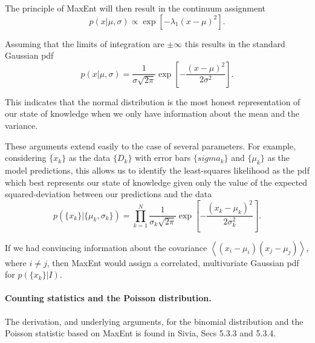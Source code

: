 \documentclass[%
oneside,                 %
final,                   %
10pt]{article}
\newenvironment{notice_mdfboxadmon}[1][]{
\begin{notice_mdfboxmdframed}[frametitle=#1]
}
{
\end{notice_mdfboxmdframed}
}
\begin{document}
The principle of MaxEnt will then result in the continuum assignment
\[
p(x|\mu,\sigma) \propto \exp \left[ - \lambda_1 ( x - \mu )^2 \right].
\]

Assuming that the limits of integration are $\pm \infty$ this results in the standard Gaussian pdf
\[
p(x|\mu,\sigma) = \frac{1}{\sigma \sqrt{2\pi}} \exp \left[ - \frac{( x - \mu )^2}{2\sigma^2} \right].
\]

This indicates that the normal distribution is the most honest representation of our state of knowledge when we only have information about the mean and the variance.


\begin{notice_mdfboxadmon}[Notice]
These arguments extend easily to the case of several parameters. For example, considering $\{x_k\}$ as the data $\{ D_k\}$ with error bars $\{sigma_k\}$ and $\{\mu_k\}$ as the model predictions, this allows us to identify the least-squares likelihood as the pdf which best represents our state of knowledge given only the value of the expected squared-deviation between our predictions and the data
\[
p\left( \{x_k\} | \{\mu_k, \sigma_k\} \right) = \prod_{k=1}^N \frac{1}{\sigma_k \sqrt{2\pi}} \exp \left[ - \frac{( x_k - \mu_k )^2}{2\sigma_k^2} \right].
\]

If we had convincing information about the covariance $\left\langle \left( x_i - \mu_i \right) \left( x_j - \mu_j \right) \right\rangle$, where $i \neq j$, then MaxEnt would assign a correlated, multivariate Gaussian pdf for $p\left( \{ x_k \} | I \right)$.
\end{notice_mdfboxadmon} %



\paragraph{Counting statistics and the Poisson distribution.}
The derivation, and underlying arguments, for the binomial distribution and the Poisson statistic based on MaxEnt is found in Sivia, Secs 5.3.3 and 5.3.4.


\end{document}
